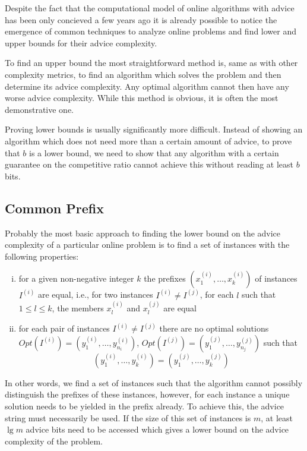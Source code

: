 Despite the fact that the computational model of online algorithms with
advice has been only concieved a few years ago it is already possible to
notice the emergence of common techniques to analyze online problems and
find lower and upper bounds for their advice complexity.

To find an upper bound the most straightforward method is, same as with
other complexity metrics, to find an algorithm which solves the problem
and then determine its advice complexity. Any optimal algorithm cannot
then have any worse advice complexity. While this method is obvious, it is
often the most demonstrative one.

Proving lower bounds is usually significantly more difficult. Instead of
showing an algorithm which does not need more than a certain amount of
advice, to prove that $b$ is a lower bound, we need to show that any
algorithm with a certain guarantee on the competitive ratio cannot achieve
this without reading at least $b$ bits.

\subsection{Common Prefix}
\label{section:common-prefix}

Probably the most basic approach to finding the lower bound on the advice
complexity of a particular online problem is to find a set of instances
with the following properties:

\begin{enumerate}[(i)]
    \item
    for a given non-negative integer $k$ the prefixes $(x_1^{(i)}, \dots,
    x_k^{(i)})$ of instances $I^{(i)}$ are equal, i.e., for two instances
    $I^{(i)} \not= I^{(j)}$, for each $l$ such that $1 \leq l \leq k$,
    the members $x_l^{(i)}$ and $x_l^{(j)}$ are equal

    \item
    for each pair of instances $I^{(i)} \not= I^{(j)}$ there are no
    optimal solutions $Opt(I^{(i)}) = (y_1^{(i)}, \dots, y_{n_i}^{(i)})$,
    $Opt(I^{(j)}) = (y_1^{(j)}, \dots, y_{n_j}^{(j)})$ such that
    $$
        (y_1^{(i)}, \dots, y_{k}^{(i)}) = (y_1^{(j)}, \dots, y_{k}^{(j)})
    $$
\end{enumerate}

In other words, we find a set of instances such that the algorithm cannot
possibly distinguish the prefixes of these instances, however, for each
instance a unique solution needs to be yielded in the prefix already. To
achieve this, the advice string must necessarily be used. If the size of
this set of instances is $m$, at least $\lg m$ advice bits need to be
accessed which gives a lower bound on the advice complexity of the
problem.

